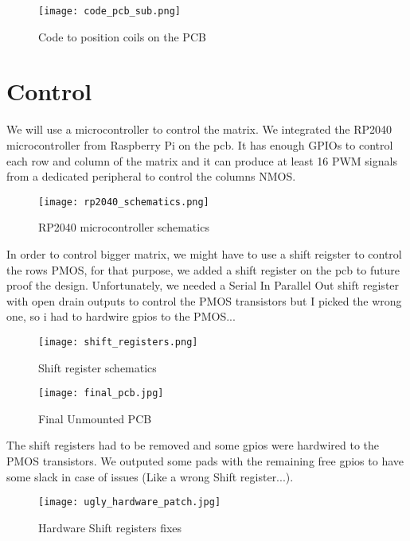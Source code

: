 \begin{figure}[H]
	\centering
	\texttt{[image: code\_pcb\_sub.png]}
	\caption[Code to position coils on the PCB]{Code to position coils on the PCB}
	\label{fig:coil_pcb}
\end{figure}

\newpage





\section{Control}

We will use a microcontroller to control the matrix. We integrated the RP2040 microcontroller from Raspberry Pi on the \gls{pcb}. It has enough GPIOs to control each row and column of the matrix and it can produce at least 16 PWM signals from a dedicated peripheral to control the columns NMOS.

\begin{figure}[H]
	\centering
	\texttt{[image: rp2040\_schematics.png]}
	\caption[RP2040 microcontroller schematics]{RP2040 microcontroller schematics}
	\label{fig:rp2040}
\end{figure}

In order to control bigger matrix, we might have to use a shift reigster to control the rows PMOS, for that purpose, we added a shift register on the \gls{pcb} to future proof the design. Unfortunately, we needed a Serial In Parallel Out shift register with open drain outputs to control the PMOS transistors but I picked the wrong one, so i had to hardwire gpios to the PMOS...

\begin{figure}[H]
	\centering
	\texttt{[image: shift\_registers.png]}
	\caption[Shift register schematics]{Shift register schematics}
	\label{fig:shift_registers}
\end{figure}

\newpage

\begin{figure}[H]
	\centering
	\texttt{[image: final\_pcb.jpg]}
	\caption[Final Unmounted PCB]{Final Unmounted PCB}
	\label{fig:final_pcb}
\end{figure}

\newpage

The shift registers had to be removed and some gpios were hardwired to the PMOS transistors. We outputed some pads with the remaining free gpios to have some slack in case of issues (Like a wrong Shift register...).

\begin{figure}[H]
	\centering
	\texttt{[image: ugly\_hardware\_patch.jpg]}
	\caption[Hardware Shift registers fixes]{Hardware Shift registers fixes}
	\label{fig:ugly_hardware_patch}
\end{figure}